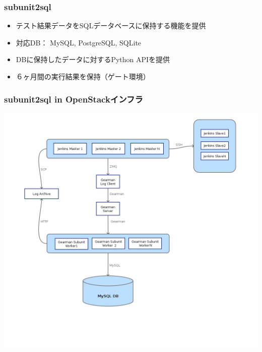 \documentclass[aspectratio=169,11pt,hyperref={colorlinks=true}]{beamer}
\begin{document}
\begin{frame}
  \frametitle{subunit2sql}
  \begin{itemize}
    \item テスト結果データをSQLデータベースに保持する機能を提供
    \item 対応DB： MySQL, PostgreSQL, SQLite
    \item DBに保持したデータに対するPython APIを提供
    \item ６ヶ月間の実行結果を保持（ゲート環境）
  \end{itemize}
\end{frame}

\begin{frame}
  \frametitle{subunit2sql in OpenStackインフラ}
  \begin{center}
    \includegraphics[height=1.1\textheight]{subunit2sql-collection.png}
  \end{center}
\end{frame}
\end{document}
